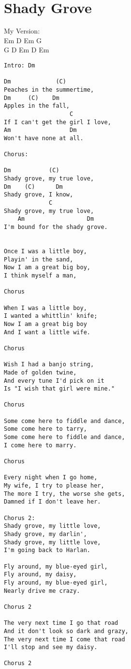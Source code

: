\documentclass[leqno]{memoir}
\begin{document}
\chapter{Shady Grove}
My Version:\\
Em D Em G\\
G D Em D Em\\
\begin{verbatim}
Intro: Dm

Dm             (C)
Peaches in the summertime,
Dm     (C)    Dm
Apples in the fall,
                   C
If I can't get the girl I love,
Am                 Dm
Won't have none at all.

Chorus:

Dm           (C)
Shady grove, my true love,
Dm    (C)      Dm
Shady grove, I know,
             C
Shady grove, my true love,
    Am                  Dm
I'm bound for the shady grove.


Once I was a little boy,
Playin' in the sand,
Now I am a great big boy,
I think myself a man,

Chorus

When I was a little boy,
I wanted a whittlin' knife;
Now I am a great big boy
And I want a little wife.

Chorus

Wish I had a banjo string,
Made of golden twine,
And every tune I'd pick on it
Is "I wish that girl were mine."

Chorus

Some come here to fiddle and dance,
Some come here to tarry,
Some come here to fiddle and dance,
I come here to marry.

Chorus

Every night when I go home,
My wife, I try to please her,
The more I try, the worse she gets,
Damned if I don't leave her.

Chorus 2:
Shady grove, my little love,
Shady grove, my darlin',
Shady grove, my little love,
I'm going back to Harlan.

Fly around, my blue-eyed girl,
Fly around, my daisy,
Fly around, my blue-eyed girl,
Nearly drive me crazy.

Chorus 2

The very next time I go that road
And it don't look so dark and grazy,  
The very next time I come that road
I'll stop and see my daisy.

Chorus 2
\end{verbatim}
\newpage
\end{document}
